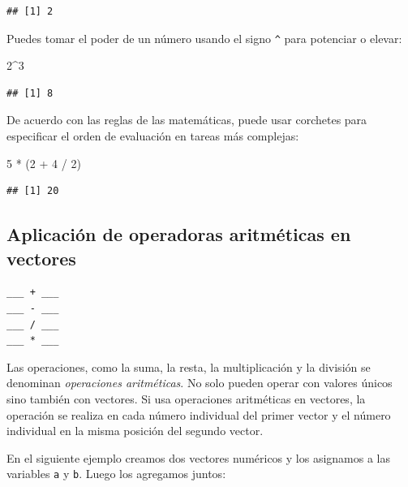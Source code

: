 \documentclass[
]{book}
\newenvironment{Shaded}{\begin{snugshade}}{\end{snugshade}}
\newcommand{\DecValTok}[1]{\textcolor[rgb]{0.00,0.00,0.81}{#1}}
\newcommand{\NormalTok}[1]{#1}
\newcommand{\SpecialCharTok}[1]{\textcolor[rgb]{0.00,0.00,0.00}{#1}}
\begin{document}
\begin{verbatim}
## [1] 2
\end{verbatim}

Puedes tomar el poder de un número usando el signo \texttt{\^{}} para potenciar o elevar:

\begin{Shaded}
\begin{Highlighting}[]
\DecValTok{2}\SpecialCharTok{\^{}}\DecValTok{3}
\end{Highlighting}
\end{Shaded}

\begin{verbatim}
## [1] 8
\end{verbatim}

De acuerdo con las reglas de las matemáticas, puede usar corchetes para especificar el orden de evaluación en tareas más complejas:

\begin{Shaded}
\begin{Highlighting}[]
\DecValTok{5} \SpecialCharTok{*}\NormalTok{ (}\DecValTok{2} \SpecialCharTok{+} \DecValTok{4} \SpecialCharTok{/} \DecValTok{2}\NormalTok{)}
\end{Highlighting}
\end{Shaded}

\begin{verbatim}
## [1] 20
\end{verbatim}

\hypertarget{aplicaciuxf3n-de-operadoras-aritmuxe9ticas-en-vectores}{%
\subsection{Aplicación de operadoras aritméticas en vectores}\label{aplicaciuxf3n-de-operadoras-aritmuxe9ticas-en-vectores}}

\begin{verbatim}
___ + ___
___ - ___
___ / ___
___ * ___
\end{verbatim}

Las operaciones, como la suma, la resta, la multiplicación y la división se denominan \emph{operaciones aritméticas}. No solo pueden operar con valores únicos sino también con vectores. Si usa operaciones aritméticas en vectores, la operación se realiza en cada número individual del primer vector y el número individual en la misma posición del segundo vector.

En el siguiente ejemplo creamos dos vectores numéricos y los asignamos a las variables \texttt{a} y \texttt{b}. Luego los agregamos juntos:
\end{document}
